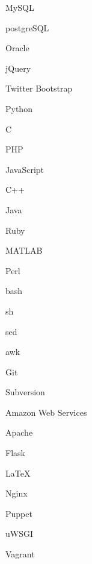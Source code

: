 \begin{technicalSkills}

{
    \item MySQL
    \item postgreSQL
    \item Oracle
}

{
    \item jQuery
    \item Twitter Bootstrap
}

{
    \item Python
    \item C
    \item PHP
    \item JavaScript
    \item C++
    \item Java
    \item Ruby
    \item MATLAB
    \item Perl
}

{
    \item bash
    \item sh
    \item sed
    \item awk
}

{
    \item Git
    \item Subversion
}

{
    \item Amazon Web Services
    \item Apache
    \item Flask
    \item \LaTeX
    \item Nginx
    \item Puppet
    \item uWSGI
    \item Vagrant
}

\end{technicalSkills}
